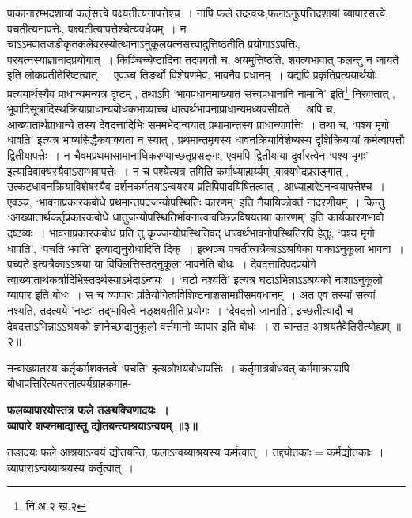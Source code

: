 पाकानारम्भदशायां कर्तृसत्त्वे पक्ष्यतीत्यनापत्तेश्च~।
नापि फले तदन्वयः,फलाऽनुत्पत्तिदशायां व्यापारसत्त्वे, पचतीत्यनापत्तेः, पक्ष्यतीत्यापत्तेश्चेत्यवधेयम्~।
न चाऽऽमवातजडीकृतकलेवरस्योत्थानाऽनुकूलयत्नसत्त्वादुत्तिष्ठतीति प्रयोगाऽऽपत्तिः, परयत्नस्याज्ञानादप्रयोगात्~।
किञ्चिच्चेष्टादिना तदवगतौ च, अयमुत्तिष्ठति, शक्त्यभावात् फलन्तु न जायते इति लोकप्रतीतेरिष्टत्वात्~।
एवञ्च तिङर्थो विशेषणमेव, भावनैव प्रधानम्~।
यद्यपि प्रकृतिप्रत्ययार्थयोः प्रत्ययार्थस्यैव प्राधान्यमन्यत्र दृष्टम् , तथाऽपि `भावप्रधानमाख्यातं सत्त्वप्रधानानि नामानि' इति\footnote{नि.अ.२ ख.२} निरुक्तात् , भूवादिसूत्रादिस्थक्रियाप्राधान्यबोधकभाष्याच्च धात्वर्थभावनाप्राधान्यमध्यवसीयते~।
अपि च, आख्यातार्थप्राधान्ये तस्य देवदत्तादिभिः सममभेदान्वयात् प्रथामान्तस्य प्राधान्यापत्तिः~।
तथा च, `पश्य मृगो धावति' इत्यत्र भाष्यसिद्धैकवाक्यता न स्यात् , प्रथमान्तमृगस्य धावनक्रियाविशेष्यस्य दृशिक्रियायां कर्मत्वापत्तौ द्वितीयापत्तेः~।
न चैवमप्रथमासामानाधिकरण्याच्छतृप्रसङ्गः, एवमपि द्वितीयाया दुर्वारत्वेन `पश्य मृगः' इत्यादिवाक्यस्यैवाऽसम्भवापत्तेः~।
न च पश्येत्यत्र तमिति कर्माध्याहार्य्यम् ,वाक्यभेदप्रसङ्गात् , उत्कटधावनक्रियाविशेषस्यैव दर्शनकर्मतयाऽन्वयस्य प्रतिपिपादयिषितत्वात् , आध्याहारेऽनन्वयापत्तेश्च~।
एवञ्च, `भावनाप्रकारकबोधे प्रथमान्तपदजन्योपस्थितिः कारणम्' इति नैयायिकोक्तं नादरणीयम्~।
किन्तु `आख्यातार्थकर्तृप्रकारकबोधे धातुजन्योपस्थितिर्भावनात्वावच्छिन्नविषयतया कारणम्' इति कार्यकारणभावो द्रष्टव्यः~।
भावनाप्रकारकबोधं प्रति तु कृज्जन्योपस्थितिवद् धात्वर्थभावनोपस्थितिरपि हेतुः, `पश्य मृगो धावति', `पचति भवति' इत्याद्यनुरोधादिति दिक्~।
इत्थञ्च पचतीत्यत्रैकाऽऽश्रयिका पाकाऽनुकूला भावना~।
पच्यते इत्यत्रैकाऽऽश्रया या विक्लित्तिस्तदनुकूला भावनेति बोधः~।
देवदत्तादिपदप्रयोगे त्वाख्यातार्थकर्त्रादिभिस्तदर्थस्याऽभेदाऽन्वयः~।
`घटो नश्यति' इत्यत्र घटाऽभिन्नाऽऽश्रयको नाशाऽनुकूलो व्यापार इति बोधः~।
स च व्यापारः प्रतियोगित्वविशिष्टनाशसामग्रीसमवधानम्~।
अत एव तस्यां सत्यां नश्यति, तदत्यये 'नष्टः' तद्भावित्वे नङ्क्षयतीति प्रयोगः~।
`देवदत्तो जानाति', इच्छतीत्यादौ च देवदत्ताऽभिन्नाऽऽश्रयको ज्ञानेच्छाद्यनुकूलो वर्त्तमानो व्यापार इति बोधः~।
स चान्तत आश्रयतैवेतिरीत्योह्यम् ॥२॥\par
नन्वाख्यातस्य कर्तृकर्मशक्तत्वे `पचति' इत्यत्रोभयबोधापत्तिः~।
कर्तृमात्रबोधवत् कर्ममात्रस्यापि बोधापत्तिरित्यतस्तात्पर्यग्राहकमाह-
\begin{center}
{\bfseries फलव्यापारयोस्तत्र फले तङ्यक्चिणादयः~।\\
 व्यापारे शप्श्नमाद्यास्तु द्योतयन्त्याश्रयाऽन्वयम् ॥३॥}
\end{center}
 तङादयः फले आश्रयाऽन्वयं द्योतयन्ति, फलाऽन्वय्याश्रयस्य कर्मत्वात्~।
तद्द्योतकाः = कर्मद्योतकाः~।
व्यापाराऽन्वय्याश्रयस्य कर्तृत्वात्~।
